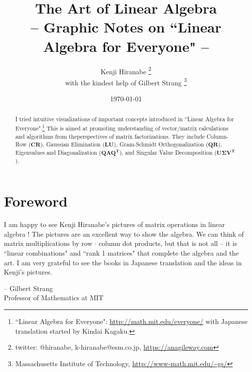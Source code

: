 \documentclass[letterpaper]{article}
\begin{document}
\title{The Art of Linear Algebra\\
\vspace{5pt}
\large{
-- Graphic Notes on ``Linear Algebra for Everyone" --
}
}

\author{Kenji Hiranabe
\thanks{twitter: @hiranabe, k-hiranabe@esm.co.jp, \url{https://anagileway.com}} \\
with the kindest help of Gilbert Strang
\thanks{Massachusetts Institute of Technology, \url{http://www-math.mit.edu/\~gs/}}
}

\date{\today}

\maketitle

\vspace{-5pt}
 
\begin{abstract}
I tried intuitive visualizations of important concepts introduced
in ``Linear Algebra for Everyone".\footnote{``Linear Algebra for Everyone":
\url{http://math.mit.edu/everyone/} with Japanese translation started by Kindai Kagaku.}\linebreak
This is aimed at promoting understanding of vector/matrix calculations
and algorithms from the\linebreak perspectives of matrix factorizations.
They include Column-Row ($\bm{CR}$), Gaussian Elimination ($\bm{LU}$),
Gram-Schmidt Orthogonalization ($\bm{QR}$), Eigenvalues and Diagonalization ($\bm{Q \Lambda Q^\mathbf{T}}$),
and Singular Value Decomposition ($\bm{U \Sigma V^\mathbf{T}}$).
\end{abstract}

\section*{Foreword}
I am happy to see Kenji Hiranabe's pictures of matrix operations in linear algebra !
The pictures are an excellent way to show the algebra.  We can think of matrix
multiplications by row $\bm{\cdot}$ column dot products, but that is not all --  it is ``linear combinations"
and ``rank 1 matrices" that complete the algebra and the art.
I am very grateful to see the books in Japanese translation
and the ideas in Kenji's pictures.
\begin{flushright}
-- Gilbert Strang \\ Professor of Mathematics at MIT
\end{flushright}
\end{document}
